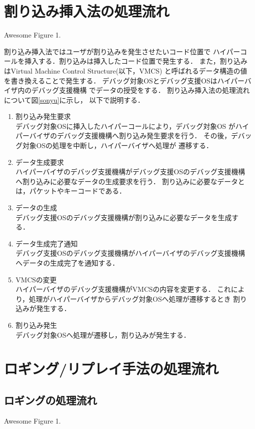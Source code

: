 \documentclass[tanilab-enum]{graduate}
\begin{document}
\section{割り込み挿入法の処理流れ}
{Awesome Figure 1.}

割り込み挿入法ではユーザが割り込みを発生させたいコード位置で
ハイパーコールを挿入する．割り込みは挿入したコード位置で発生する．
また，割り込みはVirtual Machine Control Structure(以下，VMCS)
と呼ばれるデータ構造の値を書き換えることで発生する．
デバッグ対象OSとデバッグ支援OSはハイパーバイザ内のデバッグ支援機構
でデータの授受をする．
割り込み挿入法の処理流れについて図\ref{sonyu}に示し，
以下で説明する．
\begin{enumerate}
    \item 割り込み発生要求\\
        デバッグ対象OSに挿入したハイパーコールにより，デバッグ対象OS
        がハイパーバイザのデバッグ支援機構へ割り込み発生要求を行う．
        その後，デバッグ対象OSの処理を中断し，ハイパーバイザへ処理が
        遷移する．
    \item データ生成要求\\
        ハイパーバイザのデバッグ支援機構がデバッグ支援OSのデバッグ支援機構
        へ割り込みに必要なデータの生成要求を行う．
        割り込みに必要なデータとは，パケットやキーコードである．
    \item データの生成\\
        デバッグ支援OSのデバッグ支援機構が割り込みに必要なデータを生成する．
    \item データ生成完了通知\\
        デバッグ支援OSのデバッグ支援機構がハイパーバイザのデバッグ支援機構
        へデータの生成完了を通知する．
    \item VMCSの変更\\
        ハイパーバイザのデバッグ支援機構がVMCSの内容を変更する．
        これにより，処理がハイパーバイザからデバッグ対象OSへ処理が遷移するとき
        割り込みが発生する．
    \item 割り込み発生\\
        デバッグ対象OSへ処理が遷移し，割り込みが発生する．
\end{enumerate}

\section{ロギング/リプレイ手法の処理流れ}
\subsection{ロギングの処理流れ}
{Awesome Figure 1.}
\end{document}

